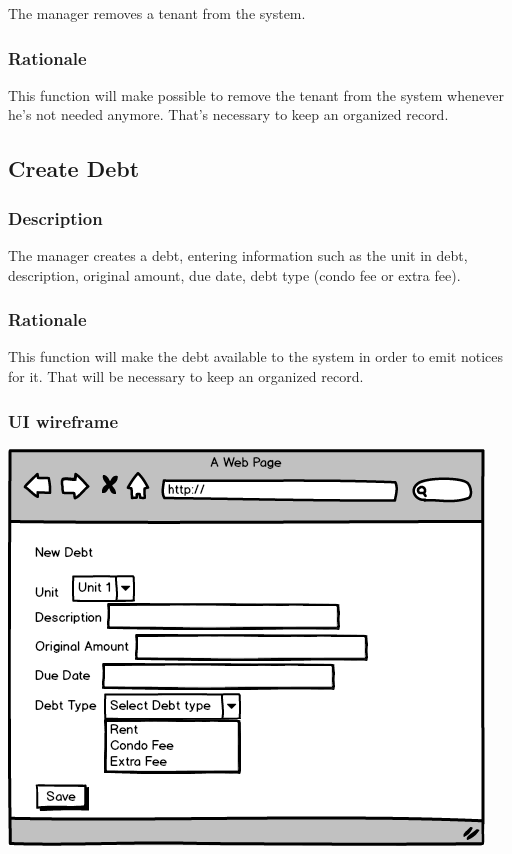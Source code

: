 \documentclass{scrreprt}
\begin{document}
The manager removes a tenant from the system.

\subsubsection{Rationale}

This function will make possible to remove the tenant from the system whenever he's not needed anymore. That's necessary to keep an organized record.

\subsection{Create Debt}
\subsubsection{Description}

The manager creates a debt, entering information such as the unit in debt, description, original amount, due date, debt type (condo fee or extra fee).

\subsubsection{Rationale}

This function will make the debt available to the system in order to emit notices for it. That will be necessary to keep an organized record.

\subsubsection{UI wireframe}
\includegraphics[scale=0.60]{mockups/createdebt.png}
\end{document}
